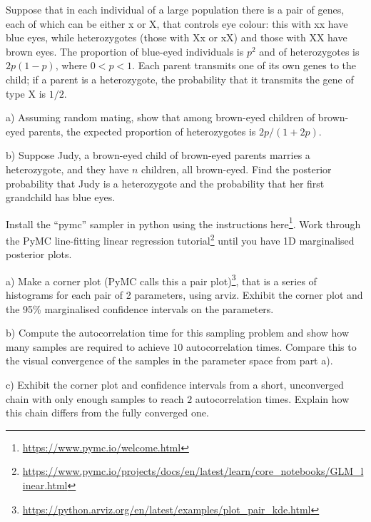 \documentclass[10pt]{article}
\newenvironment{problem}[2][Problem]{\begin{trivlist}
\item[\hskip \labelsep {\bfseries #1}\hskip \labelsep {\bfseries #2}]}{\end{trivlist}}
\begin{document}
\begin{problem}{2.2 Probability Calculation from Genetics (6)}
Suppose that in each individual of a large population there is a pair of genes, each of which can be either x or X, that controls eye colour: this with xx have blue eyes, while heterozygotes (those with Xx or xX) and those with XX have brown eyes. The proportion of blue-eyed individuals is $p^2$ and of heterozygotes is $2 p (1-p) $, where $0 < p < 1$. Each parent transmits one of its own genes to the child; if a parent is a heterozygote, the probability that it transmits the gene of type X is $1/2$.

a) Assuming random mating, show that among brown-eyed children of brown-eyed parents, the expected proportion of heterozygotes is $2p/(1+2p)$.

b) Suppose Judy, a brown-eyed child of brown-eyed parents marries a heterozygote, and they have $n$ children, all brown-eyed. Find the posterior probability that Judy is a heterozygote and the probability that her first grandchild has blue eyes.
\end{problem}

\begin{problem}{2.3 Basic MCMC (6)}
Install the ``pymc'' sampler in python using the instructions here\footnote{\url{https://www.pymc.io/welcome.html}}. Work through the PyMC line-fitting linear regression tutorial\footnote{\url{https://www.pymc.io/projects/docs/en/latest/learn/core_notebooks/GLM_linear.html}} until you have 1D marginalised posterior plots.

a) Make a corner plot (PyMC calls this a pair plot)\footnote{\url{https://python.arviz.org/en/latest/examples/plot_pair_kde.html}}, that is a series of histograms for each pair of 2 parameters, using arviz. Exhibit the corner plot and the 95\% marginalised confidence intervals on the parameters.

b) Compute the autocorrelation time for this sampling problem and show how many samples are required to achieve $10$ autocorrelation times. Compare this to the visual convergence of the samples in the parameter space from part a).

c) Exhibit the corner plot and confidence intervals from a short, unconverged chain with only enough samples to reach $2$ autocorrelation times. Explain how this chain differs from the fully converged one.
\end{problem}
\end{document}
